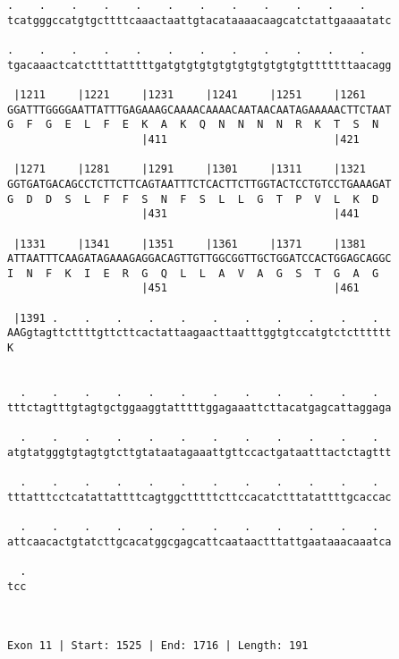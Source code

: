 \documentclass{article}
\begin{document}
\begin{Verbatim}
.    .    .    .    .    .    .    .    .    .    .    .    
tcatgggccatgtgcttttcaaactaattgtacataaaacaagcatctattgaaaatatc
                                                            
.    .    .    .    .    .    .    .    .    .    .    .    
tgacaaactcatcttttatttttgatgtgtgtgtgtgtgtgtgtgtgtttttttaacagg
                                                            
 |1211     |1221     |1231     |1241     |1251     |1261    
GGATTTGGGGAATTATTTGAGAAAGCAAAACAAAACAATAACAATAGAAAAACTTCTAAT
G  F  G  E  L  F  E  K  A  K  Q  N  N  N  N  R  K  T  S  N  
                     |411                          |421     
  
 |1271     |1281     |1291     |1301     |1311     |1321    
GGTGATGACAGCCTCTTCTTCAGTAATTTCTCACTTCTTGGTACTCCTGTCCTGAAAGAT
G  D  D  S  L  F  F  S  N  F  S  L  L  G  T  P  V  L  K  D  
                     |431                          |441     
  
 |1331     |1341     |1351     |1361     |1371     |1381    
ATTAATTTCAAGATAGAAAGAGGACAGTTGTTGGCGGTTGCTGGATCCACTGGAGCAGGC
I  N  F  K  I  E  R  G  Q  L  L  A  V  A  G  S  T  G  A  G  
                     |451                          |461     
  
 |1391 .    .    .    .    .    .    .    .    .    .    .  
AAGgtagttcttttgttcttcactattaagaacttaatttggtgtccatgtctctttttt
K                                                           
                                                            
  
  .    .    .    .    .    .    .    .    .    .    .    .  
tttctagtttgtagtgctggaaggtatttttggagaaattcttacatgagcattaggaga
                                                            
  .    .    .    .    .    .    .    .    .    .    .    .  
atgtatgggtgtagtgtcttgtataatagaaattgttccactgataatttactctagttt
                                                            
  .    .    .    .    .    .    .    .    .    .    .    .  
tttatttcctcatattattttcagtggctttttcttccacatctttatattttgcaccac
                                                            
  .    .    .    .    .    .    .    .    .    .    .    .  
attcaacactgtatcttgcacatggcgagcattcaataactttattgaataaacaaatca
                                                            
  .
tcc
   
   
 
Exon 11 | Start: 1525 | End: 1716 | Length: 191




\end{Verbatim}
\end{document}
